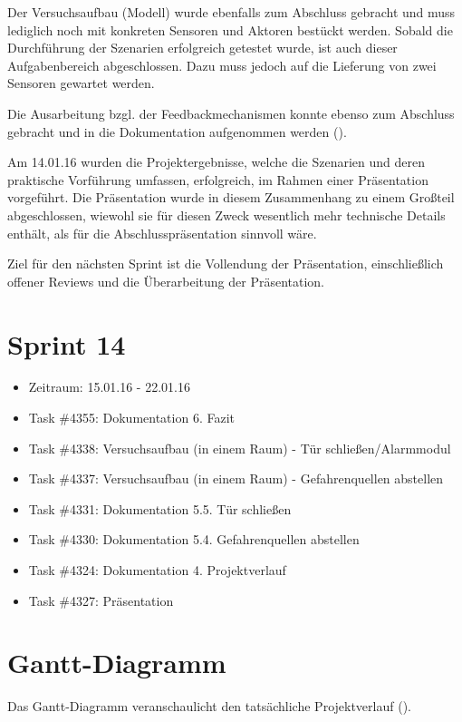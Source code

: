 \documentclass[12pt, oneside, smallheadings]{scrbook}
\begin{document}
Der Versuchsaufbau (Modell) wurde ebenfalls zum Abschluss gebracht und muss lediglich noch mit konkreten Sensoren und Aktoren bestückt werden. Sobald die Durchführung der Szenarien erfolgreich getestet wurde, ist auch dieser Aufgabenbereich abgeschlossen. Dazu muss jedoch auf die Lieferung von zwei Sensoren gewartet werden.

Die Ausarbeitung bzgl. der Feedbackmechanismen konnte ebenso zum Abschluss gebracht und in die Dokumentation aufgenommen werden ().

Am 14.01.16 wurden die Projektergebnisse, welche die Szenarien und deren praktische Vorführung umfassen, erfolgreich, im Rahmen einer Präsentation vorgeführt. Die Präsentation wurde in diesem Zusammenhang zu einem Großteil abgeschlossen, wiewohl sie für diesen Zweck wesentlich mehr technische Details enthält, als für die Abschlusspräsentation sinnvoll wäre.

Ziel für den nächsten Sprint ist die Vollendung der Präsentation, einschließlich offener Reviews und die Überarbeitung der Präsentation.

\section{Sprint 14}
\begin{itemize}
	\item Zeitraum: 15.01.16 - 22.01.16 \newline
	\item Task \#4355: Dokumentation 6. Fazit
	\item Task \#4338: Versuchsaufbau (in einem Raum) - Tür schließen/Alarmmodul
	\item Task \#4337: Versuchsaufbau (in einem Raum) - Gefahrenquellen abstellen
	\item Task \#4331: Dokumentation 5.5. Tür schließen
	\item Task \#4330: Dokumentation 5.4. Gefahrenquellen abstellen
	\item Task \#4324: Dokumentation 4. Projektverlauf
	\item Task \#4327: Präsentation
\end{itemize}


\section{Gantt-Diagramm}

Das Gantt-Diagramm veranschaulicht den tatsächliche Projektverlauf ().
\end{document}
